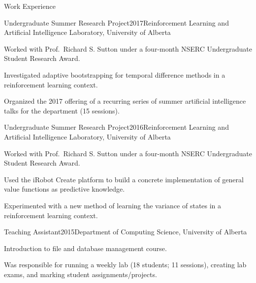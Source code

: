 \documentclass{cv}
\begin{document}
\begin{rSection}{Work Experience}

\begin{rSubsection}{Undergraduate Summer Research Project}{2017}{Reinforcement Learning and Artificial Intelligence Laboratory, University of Alberta}
\item Worked with Prof.~Richard S. Sutton under a four-month NSERC Undergraduate Student Research Award.
\item Investigated adaptive bootstrapping for temporal difference methods in a reinforcement learning context.
\item Organized the 2017 offering of a recurring series of summer artificial intelligence talks for the department (15 sessions).
\end{rSubsection}

\pagebreak


\begin{rSubsection}{Undergraduate Summer Research Project}{2016}{Reinforcement Learning and Artificial Intelligence Laboratory, University of Alberta}
\item Worked with Prof.~Richard S. Sutton under a four-month NSERC Undergraduate Student Research Award.
\item Used the iRobot Create platform to build a concrete implementation of general value functions as predictive knowledge.
\item Experimented with a new method of learning the variance of states in a reinforcement learning context.
\end{rSubsection}


\begin{rSubsection}{Teaching Assistant}{2015}{Department of Computing Science, University of Alberta}
\item Introduction to file and database management course.
\item Was responsible for running a weekly lab (18 students; 11 sessions), creating lab exams, and marking student assignments/projects.
\end{rSubsection}



\end{rSection}
\end{document}
